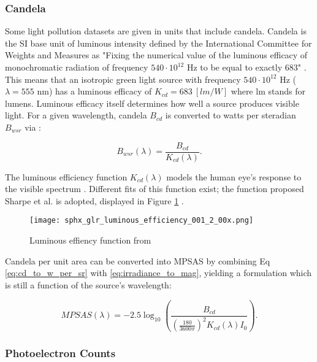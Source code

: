 \subsubsection{Candela} \label{sec:candela}

Some light pollution datasets are given in units that include candela. Candela is the SI base unit of luminous intensity defined by the International Committee for Weights and Measures as "Fixing the numerical value of the luminous efficacy of monochromatic radiation of frequency $540\cdot10^{12}$ Hz to be equal to exactly $683$" \cite{nist_units}. This means that an isotropic green light source with frequency $540\cdot10^{12}$ Hz ($\lambda = 555$ nm) has a luminous efficacy of $K_{cd} = 683 \: \left[ lm/W \right]$ where lm stands for lumens. Luminous efficacy itself determines how well a source produces visible light. For a given wavelength, candela $B_{cd}$ is converted to watts per steradian $B_{wsr}$ via \cite{nist_units}:

\begin{equation} \label{eq:cd_to_w_per_sr}
  B_{wsr}(\lambda) = \frac{B_{cd}}{K_{cd}(\lambda)}.
\end{equation}

The luminous efficiency function $K_{cd}(\lambda)$ models the human eye's response to the visible spectrum \cite{sharpe2005}. Different fits of this function exist; the function proposed Sharpe et al. is adopted, displayed in Figure \ref{fig:luminous_efficiency} \cite{sharpe2005}.

\begin{figure}[ht]
  \centering
  \texttt{[image: sphx\_glr\_luminous\_efficiency\_001\_2\_00x.png]}
  \caption{Luminous effiency function from \cite{sharpe2005}}
  \label{fig:luminous_efficiency}
\end{figure}

Candela per unit area can be converted into MPSAS by combining Eq \ref{eq:cd_to_w_per_sr} with \ref{eq:irradiance_to_mag}, yielding a formulation which is still a function of the source's wavelength:

\begin{equation} \label{eq:cd_per_m2_to_mpsas}
  MPSAS(\lambda) = -2.5 \log_{10}\left( \frac{B_{cd}}{\left( \frac{180}{ 3600\pi} \right)^2 K_{cd}(\lambda) I_0} \right).
\end{equation}

\subsubsection{Photoelectron Counts}

